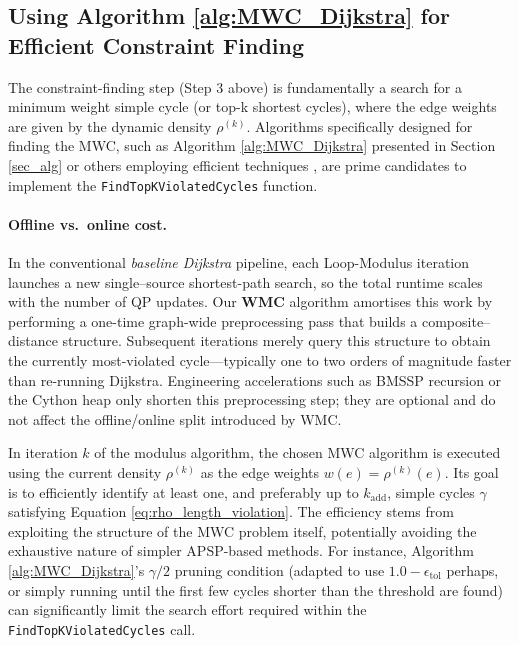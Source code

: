\documentclass{article}
\begin{document}
\subsection{Using Algorithm \ref{alg:MWC_Dijkstra} for Efficient Constraint Finding}
\label{subsec:algo1_for_constraints} %

The constraint-finding step (Step 3 above) is fundamentally a search for a minimum weight simple cycle (or top-k shortest cycles), where the edge weights are given by the dynamic density $\rho^{(k)}$. Algorithms specifically designed for finding the MWC, such as Algorithm \ref{alg:MWC_Dijkstra} presented in Section \ref{sec_alg} or others employing efficient techniques \cite{itai1978finding, orlin2016nm}, are prime candidates to implement the \texttt{FindTopKViolatedCycles} function.

\paragraph{Offline vs.~online cost.}  In the conventional \emph{baseline Dijkstra} pipeline, each Loop-Modulus iteration launches a new single–source shortest-path search, so the total runtime scales with the number of QP updates.  Our \textbf{WMC} algorithm amortises this work by performing a one-time graph-wide preprocessing pass that builds a composite–distance structure.  Subsequent iterations merely query this structure to obtain the currently most-violated cycle—typically one to two orders of magnitude faster than re-running Dijkstra.  Engineering accelerations such as BMSSP recursion or the Cython heap only shorten this preprocessing step; they are optional and do not affect the offline/online split introduced by WMC.

In iteration $k$ of the modulus algorithm, the chosen MWC algorithm is executed using the current density $\rho^{(k)}$ as the edge weights $w(e) = \rho^{(k)}(e)$. Its goal is to efficiently identify at least one, and preferably up to $k_{\text{add}}$, simple cycles $\gamma$ satisfying Equation \eqref{eq:rho_length_violation}. The efficiency stems from exploiting the structure of the MWC problem itself, potentially avoiding the exhaustive nature of simpler APSP-based methods. For instance, Algorithm \ref{alg:MWC_Dijkstra}'s $\gamma/2$ pruning condition (adapted to use $1.0 - \epsilon_{\text{tol}}$ perhaps, or simply running until the first few cycles shorter than the threshold are found) can significantly limit the search effort required within the \texttt{FindTopKViolatedCycles} call.
\end{document}

